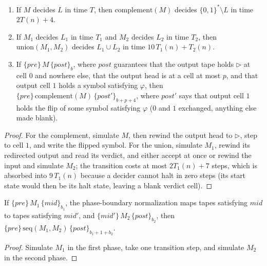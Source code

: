 \begin{lemma}
  \label{lem:models-complement-union}
  \leanok
  \begin{enumerate}
    \item If $M$ decides $L$ in time $T$, then $\mathrm{complement}(M)$
      decides $\{0,1\}^* \setminus L$ in time $2T(n) + 4$.
    \item If $M_1$ decides $L_1$ in time $T_1$ and $M_2$ decides $L_2$ in time
      $T_2$, then $\mathrm{union}(M_1, M_2)$ decides $L_1 \cup L_2$ in time
      $10\,T_1(n) + T_2(n)$.
    \item If $\{\mathit{pre}\}\, M\, \{\mathit{post}\}_b$, where
      $\mathit{post}$ guarantees that the output tape holds $\triangleright$
      at cell $0$ and nowhere else, that the output head is at a cell at most
      $p$, and that output cell $1$ holds a symbol satisfying $\varphi$, then
      $\{\mathit{pre}\}\, \mathrm{complement}(M)\, \{\mathit{post}'\}_{b + p + 4}$,
      where $\mathit{post}'$ says that output cell $1$ holds the flip of some
      symbol satisfying $\varphi$ ($0$ and $1$ exchanged, anything else made
      blank).
  \end{enumerate}
\end{lemma}
\begin{proof}
  \leanok
  For the complement, simulate $M$, then rewind the output head to
  $\triangleright$, step to cell $1$, and write the flipped symbol. For the
  union, simulate $M_1$, rewind its redirected output and read its verdict, and
  either accept at once or rewind the input and simulate $M_2$; the transition
  costs at most $2T_1(n) + 7$ steps, which is absorbed into $9\,T_1(n)$ because
  a decider cannot halt in zero steps (its start state would then be its halt
  state, leaving a blank verdict cell).
\end{proof}

\begin{theorem}
  \label{thm:models-seq-hoare}
  \leanok
  If $\{\mathit{pre}\}\, M_1\, \{\mathit{mid}\}_{b_1}$, the phase-boundary
  normalization maps tapes satisfying $\mathit{mid}$ to tapes satisfying
  $\mathit{mid}'$, and $\{\mathit{mid}'\}\, M_2\, \{\mathit{post}\}_{b_2}$, then
  $\{\mathit{pre}\}\, \mathrm{seq}(M_1, M_2)\, \{\mathit{post}\}_{b_1 + 1 + b_2}$.
\end{theorem}
\begin{proof}
  \leanok
  Simulate $M_1$ in the first phase, take one transition step, and simulate
  $M_2$ in the second phase.
\end{proof}

